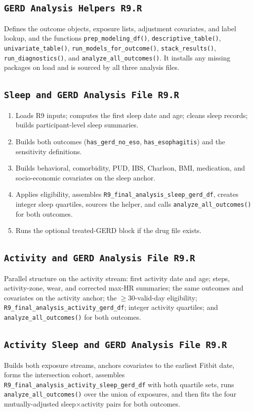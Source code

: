 \documentclass[11pt]{article}
\newcommand{\code}[1]{\texttt{\small #1}}
\begin{document}
\subsection{\code{GERD Analysis Helpers R9.R}}
Defines the outcome objects, exposure lists, adjustment covariates, and label lookup, and the functions
\code{prep_modeling_df()}, \code{descriptive_table()}, \code{univariate_table()},
\code{run_models_for_outcome()}, \code{stack_results()}, \code{run_diagnostics()}, and
\code{analyze_all_outcomes()}. It installs any missing packages on load and is sourced by all three
analysis files.

\subsection{\code{Sleep and GERD Analysis File R9.R}}
\begin{enumerate}[leftmargin=1.5em,itemsep=0pt]
  \item Loads R9 inputs; computes the first sleep date and age; cleans sleep records; builds
  participant-level sleep summaries.
  \item Builds both outcomes (\code{has_gerd_no_eso}, \code{has_esophagitis}) and the sensitivity definitions.
  \item Builds behavioral, comorbidity, PUD, IBS, Charlson, BMI, medication, and socio-economic
  covariates on the sleep anchor.
  \item Applies eligibility, assembles \code{R9_final_analysis_sleep_gerd_df}, creates integer sleep
  quartiles, sources the helper, and calls \code{analyze_all_outcomes()} for both outcomes.
  \item Runs the optional treated-GERD block if the drug file exists.
\end{enumerate}

\subsection{\code{Activity and GERD Analysis File R9.R}}
Parallel structure on the activity stream: first activity date and age; steps, activity-zone, wear, and
corrected max-HR summaries; the same outcomes and covariates on the activity anchor; the
$\geq 30$-valid-day eligibility; \code{R9_final_analysis_activity_gerd_df}; integer activity quartiles;
and \code{analyze_all_outcomes()} for both outcomes.

\subsection{\code{Activity Sleep and GERD Analysis File R9.R}}
Builds both exposure streams, anchors covariates to the earliest Fitbit date, forms the intersection
cohort, assembles \code{R9_final_analysis_activity_sleep_gerd_df} with both quartile sets, runs
\code{analyze_all_outcomes()} over the union of exposures, and then fits the four mutually-adjusted
sleep$\times$activity pairs for both outcomes.
\end{document}
